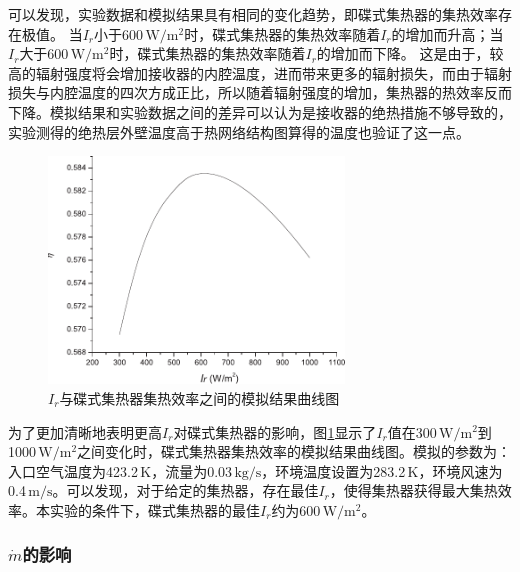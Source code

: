 可以发现，实验数据和模拟结果具有相同的变化趋势，即碟式集热器的集热效率存在极值。
当$I_r$小于600$\,\mathrm{W/m^2}$时，碟式集热器的集热效率随着$I_r$的增加而升高；当$I_r$大于600$\,\mathrm{W/m^2}$时，碟式集热器的集热效率随着$I_r$的增加而下降。
这是由于，较高的辐射强度将会增加接收器的内腔温度，进而带来更多的辐射损失，而由于辐射损失与内腔温度的四次方成正比，所以随着辐射强度的增加，集热器的热效率反而下降。模拟结果和实验数据之间的差异可以认为是接收器的绝热措施不够导致的，实验测得的绝热层外壁温度高于热网络结构图算得的温度也验证了这一点。

\begin{figure}[!ht]
\centering
\includegraphics[width=0.7\textwidth]{fig/HigherDNI-eta-dish}
\caption{$I_r$与碟式集热器集热效率之间的模拟结果曲线图}
\label{fig:HigherDNI-eta-dish}
\end{figure}
为了更加清晰地表明更高$I_r$对碟式集热器的影响，图\ref{fig:HigherDNI-eta-dish}显示了$I_r$值在300$\,\mathrm{W/m^2}$到1000$\,\mathrm{W/m^2}$之间变化时，碟式集热器集热效率的模拟结果曲线图。模拟的参数为：入口空气温度为423.2$\,\mathrm{K}$，流量为0.03$\,\mathrm{kg/s}$，环境温度设置为283.2$\,\mathrm{K}$，环境风速为0.4$\,\mathrm{m/s}$。可以发现，对于给定的集热器，存在最佳$I_r$，使得集热器获得最大集热效率。本实验的条件下，碟式集热器的最佳$I_r$约为600$\,\mathrm{W/m^2}$。

\subsubsection{$\dot{m}$的影响}

